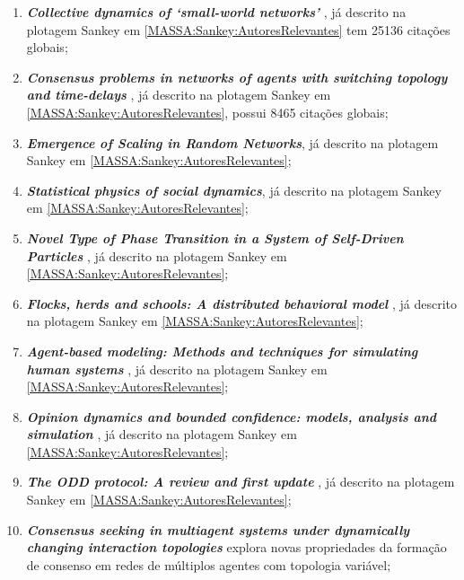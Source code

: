 \begin{enumerate}
\item \textit{\textbf{Collective dynamics of ‘small-world networks'}} \citep{watts_collective_1998}, já descrito na plotagem Sankey em \ref{MASSA:Sankey:AutoresRelevantes} tem 25136 citações globais; 
\item \textit{\textbf{Consensus problems in networks of agents with switching topology and time-delays}} \citep{olfati-saber_consensus_2004}, já descrito na plotagem Sankey em \ref{MASSA:Sankey:AutoresRelevantes}, possui 8465 citações globais;

\item \textit{\textbf{Emergence of Scaling in Random Networks}}\citep{barabasi_emergence_1999}, já descrito na plotagem Sankey em \ref{MASSA:Sankey:AutoresRelevantes};

\item \textit{\textbf{Statistical physics of social dynamics}}\citep{castellano_statistical_2009}, já descrito na plotagem Sankey em \ref{MASSA:Sankey:AutoresRelevantes}; 
\item \textit{\textbf{Novel Type of Phase Transition in a System of Self-Driven Particles}} \citep{vicsek_novel_1995}, já descrito na plotagem Sankey em \ref{MASSA:Sankey:AutoresRelevantes}; 

\item \textit{\textbf{Flocks, herds and schools: A distributed behavioral model}} \citep{reynolds_flocks_1987}, já descrito na plotagem Sankey em \ref{MASSA:Sankey:AutoresRelevantes};

\item \textit{\textbf{Agent-based modeling: Methods and techniques for simulating human systems}} \citep{bonabeau_agent-based_2002}, já descrito na plotagem Sankey em \ref{MASSA:Sankey:AutoresRelevantes};

\item \textit{\textbf{Opinion dynamics and bounded confidence: models, analysis and simulation}} \citep{hegselmann_opinion_2002}, já descrito na plotagem Sankey em \ref{MASSA:Sankey:AutoresRelevantes}; 

\item \textit{\textbf{The ODD protocol: A review and first update}} \citep{grimm_odd_2010}, já descrito na plotagem Sankey em \ref{MASSA:Sankey:AutoresRelevantes};

\item \textit{\textbf{Consensus seeking in multiagent systems under dynamically changing interaction topologies}} \citep{ren_consensus_2005} explora novas propriedades da formação de consenso em redes de múltiplos agentes com topologia variável;



\end{enumerate}
